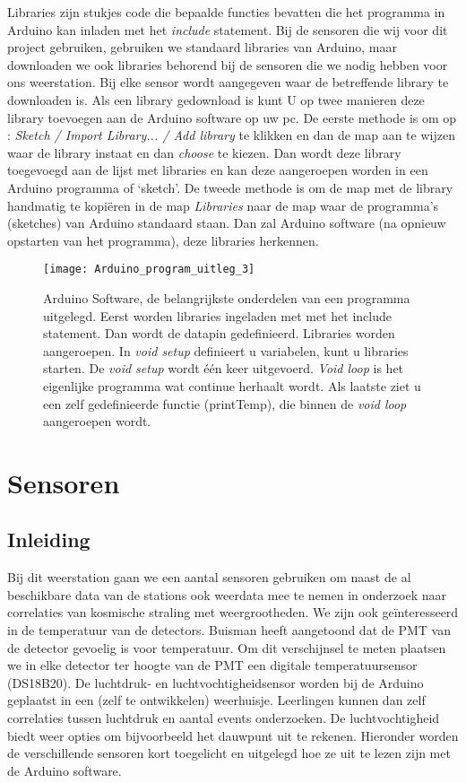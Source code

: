 Libraries zijn stukjes code die bepaalde functies bevatten die het
programma in Arduino kan inladen met het \emph{include} statement. Bij
de sensoren die wij voor dit project gebruiken, gebruiken we standaard
libraries van Arduino, maar downloaden we ook libraries behorend bij de
sensoren die we nodig hebben voor ons weerstation. Bij elke sensor wordt
aangegeven waar de betreffende library te downloaden is. Als een library
gedownload is kunt U op twee manieren deze library toevoegen aan de
Arduino software op uw pc. De eerste methode is om op : \emph{Sketch /
Import Library... / Add library} te klikken en dan de map aan te wijzen
waar de library instaat en dan \emph{choose} te kiezen. Dan wordt deze
library toegevoegd aan de lijst met libraries en kan deze aangeroepen
worden in een Arduino programma of `sketch'. De tweede methode is om de
map met de library handmatig te kopi\"{e}ren in de map \emph{Libraries}
naar de map waar de programma's (sketches) van Arduino standaard staan.
Dan zal Arduino software (na opnieuw opstarten van het programma), deze
libraries herkennen.


\begin{figure}
    \centering
    \texttt{[image: Arduino\_program\_uitleg\_3]}
    \caption{Arduino Software, de belangrijkste onderdelen van een
    programma uitgelegd. Eerst worden libraries ingeladen met
    met het include statement. Dan wordt de datapin gedefinieerd.
    Libraries worden aangeroepen. In \emph{void setup} definieert u variabelen,
    kunt u libraries starten. De \emph{void setup} wordt één keer uitgevoerd.
    \emph{Void loop} is het eigenlijke programma wat continue herhaalt wordt.
    Als laatste ziet u een zelf gedefinieerde functie (printTemp), die binnen
    de \emph{void loop} aangeroepen wordt.}
   \label{fig:Arduino_program_uitleg_3}
\end{figure}


\section{Sensoren}

\subsection{Inleiding}

Bij dit weerstation gaan we een aantal sensoren gebruiken om naast de al
beschikbare data van de \hisparc stations ook weerdata mee te nemen in
onderzoek naar correlaties van kosmische straling met weergrootheden. We
zijn ook ge\"{i}nteresseerd in de temperatuur van de detectors.
Buisman \cite{Buisman} heeft aangetoond dat de PMT van de detector gevoelig is
voor temperatuur. Om dit verschijnsel te meten plaatsen we in elke detector
ter hoogte van de PMT een digitale temperatuursensor (DS18B20). De luchtdruk-
en luchtvochtigheidsensor worden bij de Arduino geplaatst in een (zelf te
ontwikkelen) weerhuisje. Leerlingen kunnen dan zelf correlaties tussen
luchtdruk en aantal events onderzoeken. De luchtvochtigheid biedt weer
opties om bijvoorbeeld het dauwpunt uit te rekenen. Hieronder worden de
verschillende sensoren kort toegelicht en uitgelegd hoe ze uit te lezen
zijn met de Arduino software.


